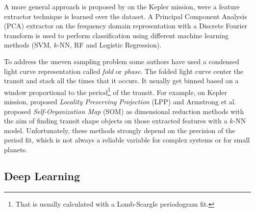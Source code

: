 A more general approach is proposed by \citep{bugueno2018refining} on the Kepler mission, were a feature extractor technique is learned over the dataset. A Principal Component Analysis (PCA) extractor on the frequency domain representation with a Discrete Fourier transform is used to perform classification using different machine learning methods (SVM, $k$-NN, RF and Logistic Regression). %

To address the uneven sampling problem some authors have used a condensed light curve representation called \textit{fold} or \textit{phase}. The folded light curve center the transit and stack all the times that it occurs. It usually get binned based on a window proportional to the period\footnote{That is usually calculated with a Lomb-Scargle \citep{lomb1976least} periodogram fit.} of the transit. For example, on Kepler mission, \citep{thompson2015machine} proposed \textit{Locality Preserving Projection} (LPP) and Armstrong et al. \citep{armstrong2016transit} proposed \textit{Self-Organization Map} (SOM) as dimensional reduction methods with the aim of finding transit shape objects on those extracted features with a $k$-NN model. 
Unfortunately, these methods strongly depend on the precision of the period fit, which is not always a reliable variable for complex systems or for small planets. 

\subsection{Deep Learning}

